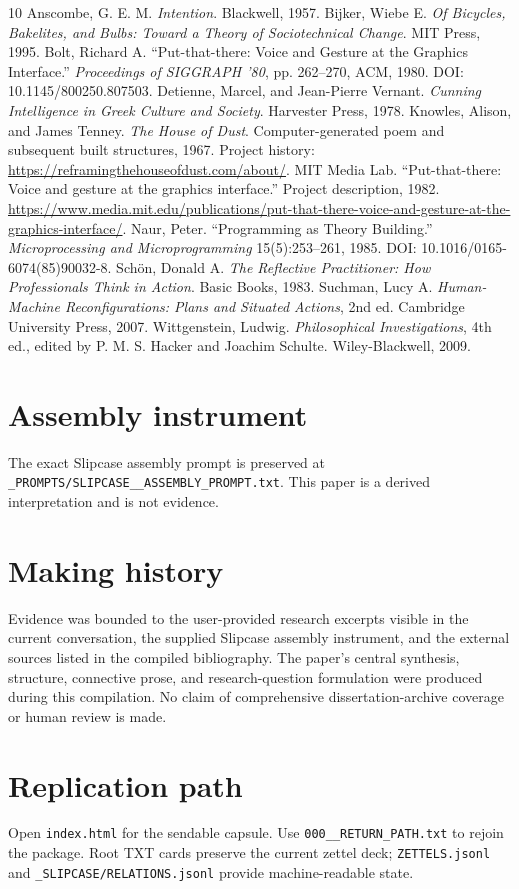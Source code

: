 \documentclass[11pt]{article}
\begin{document}
\begin{thebibliography}{10}
 Anscombe, G. E. M. \emph{Intention}. Blackwell, 1957.
 Bijker, Wiebe E. \emph{Of Bicycles, Bakelites, and Bulbs: Toward a Theory of Sociotechnical Change}. MIT Press, 1995.
 Bolt, Richard A. ``Put-that-there: Voice and Gesture at the Graphics Interface.'' \emph{Proceedings of SIGGRAPH '80}, pp. 262--270, ACM, 1980. DOI: 10.1145/800250.807503.
 Detienne, Marcel, and Jean-Pierre Vernant. \emph{Cunning Intelligence in Greek Culture and Society}. Harvester Press, 1978.
 Knowles, Alison, and James Tenney. \emph{The House of Dust}. Computer-generated poem and subsequent built structures, 1967. Project history: \url{https://reframingthehouseofdust.com/about/}.
 MIT Media Lab. ``Put-that-there: Voice and gesture at the graphics interface.'' Project description, 1982. \url{https://www.media.mit.edu/publications/put-that-there-voice-and-gesture-at-the-graphics-interface/}.
 Naur, Peter. ``Programming as Theory Building.'' \emph{Microprocessing and Microprogramming} 15(5):253--261, 1985. DOI: 10.1016/0165-6074(85)90032-8.
 Schön, Donald A. \emph{The Reflective Practitioner: How Professionals Think in Action}. Basic Books, 1983.
 Suchman, Lucy A. \emph{Human-Machine Reconfigurations: Plans and Situated Actions}, 2nd ed. Cambridge University Press, 2007.
 Wittgenstein, Ludwig. \emph{Philosophical Investigations}, 4th ed., edited by P. M. S. Hacker and Joachim Schulte. Wiley-Blackwell, 2009.
\end{thebibliography}

\appendix
\section{Assembly instrument}
The exact Slipcase assembly prompt is preserved at \texttt{\_PROMPTS/SLIPCASE\_\_ASSEMBLY\_PROMPT.txt}. This paper is a derived interpretation and is not evidence.

\section{Making history}
Evidence was bounded to the user-provided research excerpts visible in the current conversation, the supplied Slipcase assembly instrument, and the external sources listed in the compiled bibliography. The paper's central synthesis, structure, connective prose, and research-question formulation were produced during this compilation. No claim of comprehensive dissertation-archive coverage or human review is made.

\section{Replication path}
Open \texttt{index.html} for the sendable capsule. Use \texttt{000\_\_RETURN\_PATH.txt} to rejoin the package. Root TXT cards preserve the current zettel deck; \texttt{ZETTELS.jsonl} and \texttt{\_SLIPCASE/RELATIONS.jsonl} provide machine-readable state.
\end{document}

